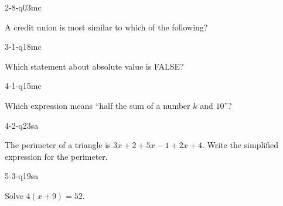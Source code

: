 \begin{practiceQuestion}{2-8-q03}{mc}
\begin{questionText}
A credit union is most similar to which of the following?
\end{questionText}
\end{practiceQuestion}

\begin{practiceQuestion}{3-1-q18}{mc}
\begin{questionText}
Which statement about absolute value is FALSE?
\end{questionText}
\end{practiceQuestion}

\begin{practiceQuestion}{4-1-q15}{mc}
\begin{questionText}
Which expression means ``half the sum of a number $k$ and $10$''?
\end{questionText}
\end{practiceQuestion}

\begin{practiceQuestion}{4-2-q23}{sa}
\begin{questionText}
The perimeter of a triangle is $3x + 2 + 5x - 1 + 2x + 4$. Write the simplified expression for the perimeter.
\end{questionText}
\end{practiceQuestion}

\begin{practiceQuestion}{5-3-q19}{sa}
\begin{questionText}
Solve $4(x + 9) = 52$.
\end{questionText}
\end{practiceQuestion}

